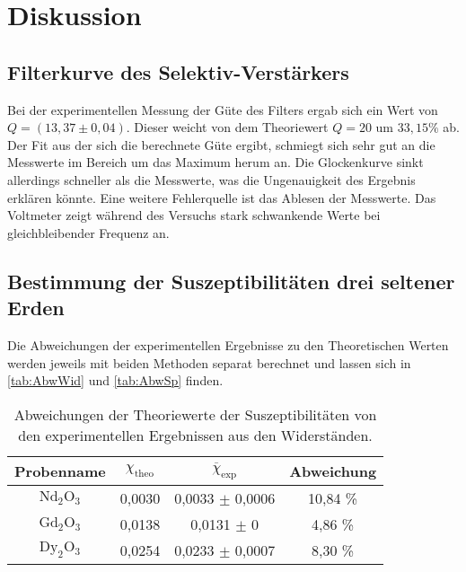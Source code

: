 \section{Diskussion}
\label{sec:Diskussion}

\subsection{Filterkurve des Selektiv-Verstärkers}

Bei der experimentellen Messung der Güte des Filters ergab sich ein Wert
von $Q = (13, 37 \pm 0, 04)$. Dieser weicht von dem Theoriewert $Q = 20$
um $33,15 \%$ ab. Der Fit aus der sich die berechnete Güte ergibt, schmiegt
sich sehr gut an die Messwerte im Bereich um das Maximum herum an. Die 
Glockenkurve sinkt allerdings schneller als die Messwerte, was die Ungenauigkeit
des Ergebnis erklären könnte. Eine weitere Fehlerquelle ist das Ablesen der Messwerte.
Das Voltmeter zeigt während des Versuchs stark schwankende Werte bei gleichbleibender
Frequenz an.

\subsection{Bestimmung der Suszeptibilitäten drei seltener Erden}

Die Abweichungen der experimentellen Ergebnisse zu den Theoretischen Werten 
werden jeweils mit beiden Methoden separat berechnet und lassen sich in \autoref{tab:AbwWid}
und \autoref{tab:AbwSp} finden.
\begin{table}
    \centering
    \caption{Abweichungen der Theoriewerte der Suszeptibilitäten von den experimentellen Ergebnissen aus den Widerständen.}
    \label{tab:AbwWid}
    \begin{tabular}{c || c | c | c }
      \toprule
      Probenname & $\chi_{\mathrm{theo}}$ & $\overline{\chi}_{\mathrm{exp}}$ & Abweichung \\
      \hline
      $\mathrm{Nd}_2 \mathrm{O}_3$ & 0,0030 & 0,0033 $\pm$ 0,0006   & 10,84 \%\\
      $\mathrm{Gd}_2 \mathrm{O}_3$ & 0,0138 & 0,0131 $\pm$ 0        & 4,86 \%\\
      $\mathrm{Dy}_2 \mathrm{O}_3$ & 0,0254 & 0,0233 $\pm$ 0,0007   & 8,30 \%\\
      \midrule
      \bottomrule
    \end{tabular}
\end{table}
  
